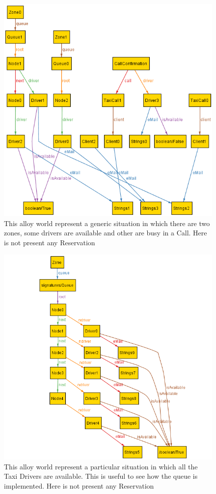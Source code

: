 \documentclass[a4paper]{article}
\begin{document}
\nopagebreak
\begin{figure}[H]
\includegraphics[width=\worldsWidth]{Alloy-Generic}
\centering
\caption[Alloy Generic World]{This alloy world represent a generic situation in which there are two zones, some drivers are available and other are busy in a Call. Here is not present any Reservation}
\label{fig:alloyworldgeneric}
\end{figure}

\begin{figure}[H]
\includegraphics[width=\worldsWidth]{Alloy-AllAvailable}
\centering
\caption[Alloy World with all the Taxi Drivers Available]{This alloy world represent a particular situation in which all the Taxi Drivers are available. This is useful to see how the queue is implemented. Here is not present any Reservation}
\label{fig:alloyworldallavailable}
\end{figure}
\end{document}
